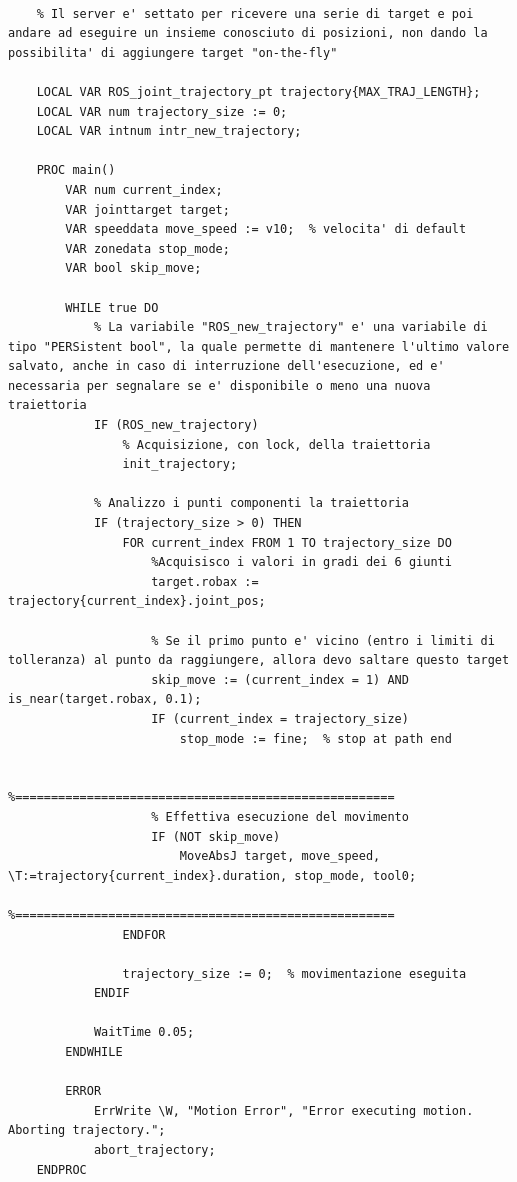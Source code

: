 \begin{lstlisting}[style=Matlab-editor,caption=Movimentazione effettiva del manipolatore,captionpos=b,label={Code:ROSMotion}, basicstyle=\scriptsize\ttfamily,frame=trBL]

	% Il server e' settato per ricevere una serie di target e poi andare ad eseguire un insieme conosciuto di posizioni, non dando la possibilita' di aggiungere target "on-the-fly"
	
	LOCAL VAR ROS_joint_trajectory_pt trajectory{MAX_TRAJ_LENGTH};
	LOCAL VAR num trajectory_size := 0;
	LOCAL VAR intnum intr_new_trajectory;
	
	PROC main()
		VAR num current_index;
		VAR jointtarget target;
		VAR speeddata move_speed := v10;  % velocita' di default
		VAR zonedata stop_mode;
		VAR bool skip_move;
				
		WHILE true DO
			% La variabile "ROS_new_trajectory" e' una variabile di tipo "PERSistent bool", la quale permette di mantenere l'ultimo valore salvato, anche in caso di interruzione dell'esecuzione, ed e' necessaria per segnalare se e' disponibile o meno una nuova traiettoria
			IF (ROS_new_trajectory)
				% Acquisizione, con lock, della traiettoria
				init_trajectory;
			
			% Analizzo i punti componenti la traiettoria
			IF (trajectory_size > 0) THEN
				FOR current_index FROM 1 TO trajectory_size DO
					%Acquisisco i valori in gradi dei 6 giunti
					target.robax := trajectory{current_index}.joint_pos;
					
					% Se il primo punto e' vicino (entro i limiti di tolleranza) al punto da raggiungere, allora devo saltare questo target
					skip_move := (current_index = 1) AND is_near(target.robax, 0.1);
					IF (current_index = trajectory_size) 
						stop_mode := fine;  % stop at path end
					
					%=====================================================
					% Effettiva esecuzione del movimento
					IF (NOT skip_move)
						MoveAbsJ target, move_speed, \T:=trajectory{current_index}.duration, stop_mode, tool0;
					%=====================================================
				ENDFOR
				
				trajectory_size := 0;  % movimentazione eseguita
			ENDIF
			
			WaitTime 0.05; 
		ENDWHILE
		
		ERROR
			ErrWrite \W, "Motion Error", "Error executing motion.  Aborting trajectory.";
			abort_trajectory;
	ENDPROC
\end{lstlisting}

